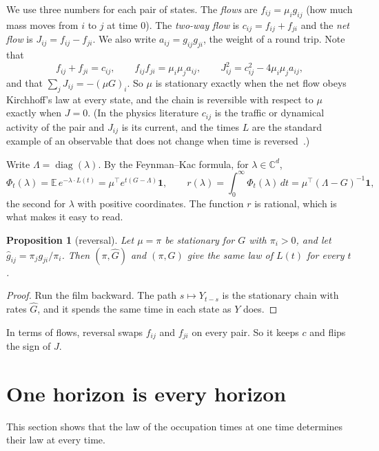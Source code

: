 \documentclass[11pt]{article}
\newtheorem{proposition}[theorem]{Proposition}
\theoremstyle{definition}
\theoremstyle{remark}
\newcommand{\E}{\mathbb E}
\newcommand{\C}{\mathbb C}
\newcommand{\one}{\mathbf 1}
\begin{document}
We use three numbers for each pair of states. The \emph{flows} are
$f_{ij}=\mu_ig_{ij}$ (how much mass moves from $i$ to $j$ at time $0$). The
\emph{two-way flow} is $c_{ij}=f_{ij}+f_{ji}$ and the \emph{net flow} is
$J_{ij}=f_{ij}-f_{ji}$. We also write $a_{ij}=g_{ij}g_{ji}$, the weight of a
round trip. Note that
\begin{equation}\label{eq:roots}
f_{ij}+f_{ji}=c_{ij},\qquad f_{ij}f_{ji}=\mu_i\mu_ja_{ij},\qquad
J_{ij}^2=c_{ij}^2-4\mu_i\mu_ja_{ij},
\end{equation}
and that $\sum_jJ_{ij}=-(\mu G)_i$. So $\mu$ is stationary exactly when the net
flow obeys Kirchhoff's law at every state, and the chain is reversible with
respect to $\mu$ exactly when $J=0$. (In the physics literature $c_{ij}$ is the
traffic or dynamical activity of the pair and $J_{ij}$ is its current, and the
times $L$ are the standard example of an observable that does not change when
time is reversed~\cite{mnw2008}.)

Write $\Lambda=\operatorname{diag}(\lambda)$. By the Feynman--Kac formula, for
$\lambda\in\C^d$,
\begin{equation}\label{eq:FK}
\Phi_t(\lambda)=\E\,e^{-\lambda\cdot L(t)}=\mu^{\top}e^{t(G-\Lambda)}\one,
\qquad
r(\lambda)=\int_0^\infty\Phi_t(\lambda)\,dt=\mu^{\top}(\Lambda-G)^{-1}\one ,
\end{equation}
the second for $\lambda$ with positive coordinates. The function $r$ is rational,
which is what makes it easy to read.

\begin{proposition}[reversal]\label{prop:reversal}
Let $\mu=\pi$ be stationary for $G$ with $\pi_i>0$, and let
$\hat g_{ij}=\pi_jg_{ji}/\pi_i$. Then $(\pi,\hat G)$ and $(\pi,G)$ give the same
law of $L(t)$ for every $t$.
\end{proposition}
\begin{proof}
Run the film backward. The path $s\mapsto Y_{t-s}$ is the stationary chain with
rates $\hat G$, and it spends the same time in each state as $Y$ does.
\end{proof}

In terms of flows, reversal swaps $f_{ij}$ and $f_{ji}$ on every pair. So it
keeps $c$ and flips the sign of $J$.

\section{One horizon is every horizon}

This section shows that the law of the occupation times at one time determines
their law at every time.
\end{document}
